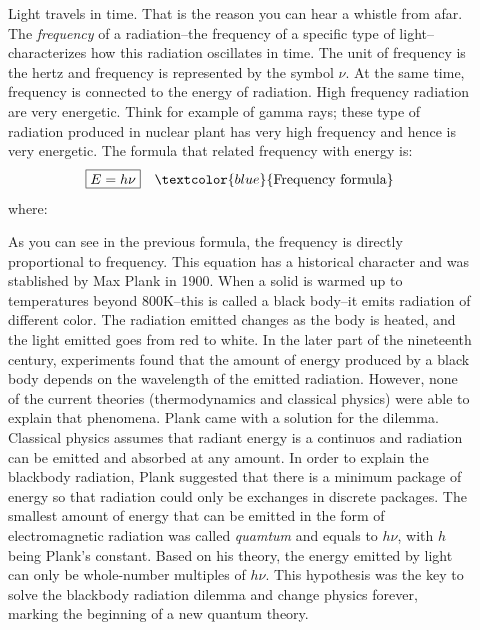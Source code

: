 \documentclass[main.tex]{subfiles}
\begin{document}
\begin{description}
\item[] Light travels in time. That is the reason you can hear a whistle from afar. The \emph{frequency} of a radiation--the frequency of a specific type of light--characterizes how this radiation oscillates in time. The unit of frequency is the hertz and frequency is represented by the symbol $\nu$. At the same time, frequency is connected to the energy of radiation. High frequency radiation are very energetic. Think for example of gamma rays; these type of radiation produced in nuclear plant has very high frequency and hence is very energetic. The formula that related frequency with energy is:%
\begin{equation*}
\boxed{  E=h\nu  } \quad \textcolor{blue}{\text{Frequency formula}}
\end{equation*}
where:
As you can see in the previous formula, the frequency is directly proportional to frequency.
This equation has a historical character and was stablished by Max Plank in 1900.
When a solid is warmed up to temperatures beyond 800K--this is called a black body--it emits radiation of different color. The radiation emitted changes as the body is heated, and the light emitted goes from red to white. In the later part of the nineteenth century, experiments found that the amount of energy produced by a black body depends on the wavelength of the emitted radiation. However, none of the current theories (thermodynamics and classical physics) were able to explain that phenomena. Plank came with a solution for the dilemma. Classical physics assumes that radiant energy is a continuos and radiation can be emitted and absorbed at any amount. In order to explain the blackbody radiation, Plank suggested that there is a minimum package of energy so that radiation could only be exchanges in discrete packages. The smallest amount of energy that can be emitted in the form of electromagnetic radiation was called \emph{quamtum} and equals to $h\nu$, with $h$ being Plank's constant. Based on his theory, the energy emitted by light can only be whole-number multiples of $h\nu$. This hypothesis was the key to solve the blackbody radiation dilemma and change physics forever, marking the beginning of a new quantum theory.


\end{description}
\end{document}
